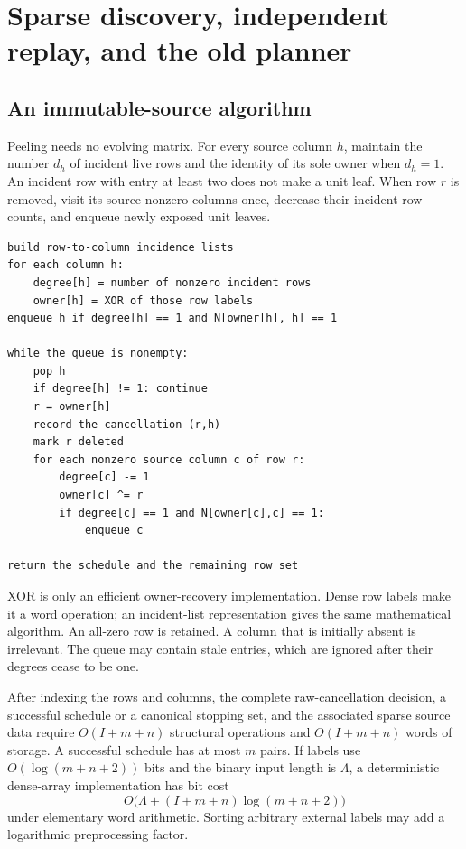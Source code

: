 \section{Sparse discovery, independent replay, and the old planner}
\label{sec:algorithms}

\subsection{An immutable-source algorithm}

Peeling needs no evolving matrix. For every source column $h$, maintain the
number $d_h$ of incident live rows and the identity of its sole owner when
$d_h=1$. An incident row with entry at least two does not make a unit leaf.
When row $r$ is removed, visit its source nonzero columns once, decrease
their incident-row counts, and enqueue newly exposed unit leaves.

\begin{lstlisting}[caption={Complete raw cancellation from source incidence.}]
build row-to-column incidence lists
for each column h:
    degree[h] = number of nonzero incident rows
    owner[h] = XOR of those row labels
enqueue h if degree[h] == 1 and N[owner[h], h] == 1

while the queue is nonempty:
    pop h
    if degree[h] != 1: continue
    r = owner[h]
    record the cancellation (r,h)
    mark r deleted
    for each nonzero source column c of row r:
        degree[c] -= 1
        owner[c] ^= r
        if degree[c] == 1 and N[owner[c],c] == 1:
            enqueue c

return the schedule and the remaining row set
\end{lstlisting}

XOR is only an efficient owner-recovery implementation. Dense row labels
make it a word operation; an incident-list representation gives the same
mathematical algorithm. An all-zero row is retained. A column that is
initially absent is irrelevant. The queue may contain stale entries, which
are ignored after their degrees cease to be one.

\begin{theorem}\label{thm:linear}
After indexing the rows and columns, the complete raw-cancellation decision,
a successful schedule or a canonical stopping set, and the associated
sparse source data require $O(I+m+n)$ structural operations and
$O(I+m+n)$ words of storage. A successful schedule has at most $m$ pairs.
If labels use $O(\log(m+n+2))$ bits and the binary input length is $\Lambda$,
a deterministic dense-array implementation has bit cost
\[
 O\bigl(\Lambda+(I+m+n)\log(m+n+2)\bigr)
\]
under elementary word arithmetic. Sorting arbitrary external labels may
add a logarithmic preprocessing factor.
\end{theorem}


